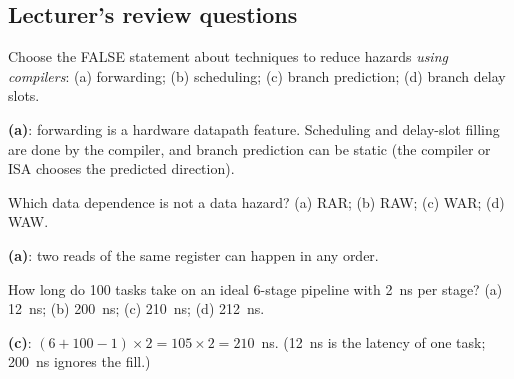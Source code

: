 \subsection{Lecturer's review questions}

\begin{exercise}[Lecturer 1]
Choose the FALSE statement about techniques to reduce hazards \emph{using
compilers}: (a) forwarding; (b) scheduling; (c) branch prediction; (d) branch delay
slots.
\end{exercise}
\begin{solution}
\textbf{(a)}: forwarding is a hardware datapath feature. Scheduling and delay-slot
filling are done by the compiler, and branch prediction can be static (the compiler
or ISA chooses the predicted direction).
\end{solution}

\begin{exercise}[Lecturer 2]
Which data dependence is not a data hazard? (a) RAR; (b) RAW; (c) WAR; (d) WAW.
\end{exercise}
\begin{solution}
\textbf{(a)}: two reads of the same register can happen in any order.
\end{solution}

\begin{exercise}[Lecturer 3]
How long do 100 tasks take on an ideal 6-stage pipeline with 2~ns per stage?
(a) 12~ns; (b) 200~ns; (c) 210~ns; (d) 212~ns.
\end{exercise}
\begin{solution}
\textbf{(c)}: $(6+100-1)\times2=105\times2=210$~ns. (12~ns is the latency of one
task; 200~ns ignores the fill.)
\end{solution}

